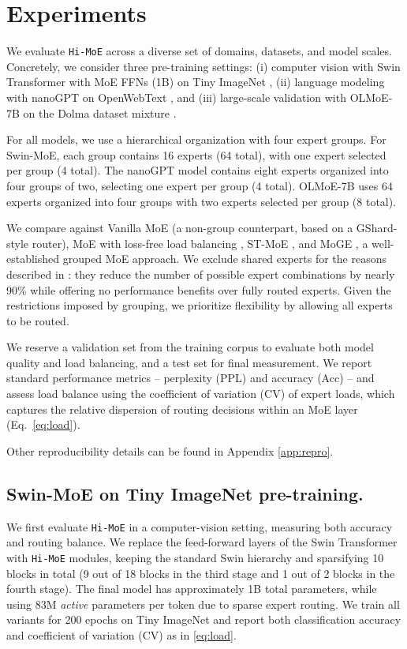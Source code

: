\documentclass[sigconf,nonacm]{acmart}
\begin{document}
\section{Experiments}
\label{sec:experiments}

We evaluate \texttt{Hi-MoE} across a diverse set of domains, datasets, and model scales. Concretely, we consider three pre-training settings: (i) computer vision with Swin Transformer with MoE FFNs (1B) \citep{swin} on Tiny ImageNet \citep{imagenet}, (ii) language modeling with nanoGPT \citep{nanogpt} on OpenWebText \citep{openwebtext}, and (iii) large-scale validation with OLMoE-7B \citep{olmoe} on the Dolma dataset mixture \citep{dolma}.

For all models, we use a hierarchical organization with four expert groups. For Swin-MoE, each group contains 16 experts (64 total), with one expert selected per group (4 total). The nanoGPT model contains eight experts organized into four groups of two, selecting one expert per group (4 total). OLMoE-7B uses 64 experts organized into four groups with two experts selected per group (8 total).

We compare against Vanilla MoE (a non-group counterpart, based on a GShard-style router), MoE with loss-free load balancing \citep{lossfree}, ST-MoE \citep{stmoe}, and MoGE \citep{moge}, a well-established grouped MoE approach. We exclude shared experts for the reasons described in \citep{olmoe}: they reduce the number of possible expert combinations by nearly 90\% while offering no performance benefits over fully routed experts. Given the restrictions imposed by grouping, we prioritize flexibility by allowing all experts to be routed.

We reserve a validation set from the training corpus to evaluate both model quality and load balancing, and a test set for final measurement. We report standard performance metrics -- perplexity (PPL) and accuracy (Acc) -- and assess load balance using the coefficient of variation (CV) of expert loads, which captures the relative dispersion of routing decisions within an MoE layer (Eq.~\eqref{eq:load}).

Other reproducibility details can be found in Appendix \ref{app:repro}.

\subsection{Swin-MoE on Tiny ImageNet pre-training.}
We first evaluate \texttt{Hi-MoE} in a computer-vision setting, measuring both accuracy and routing balance.
We replace the feed-forward layers of the Swin Transformer with \texttt{Hi-MoE} modules, keeping the standard Swin hierarchy and sparsifying 10 blocks in total (9 out of 18 blocks in the third stage and 1 out of 2 blocks in the fourth stage).
The final model has approximately 1B total parameters, while using 83M \emph{active} parameters per token due to sparse expert routing.
We train all variants for 200 epochs on Tiny ImageNet and report both classification accuracy and coefficient of variation (CV) as in \eqref{eq:load}.
\end{document}
